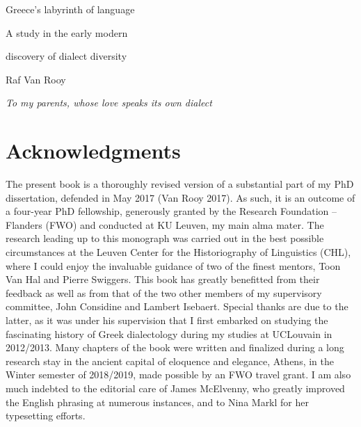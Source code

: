 
\clearpage\setcounter{page}{1}\begin{styleStandard}
Greece’s labyrinth of language
\end{styleStandard}

\begin{styleStandard}
A study in the early modern
\end{styleStandard}

\begin{styleStandard}
discovery of dialect diversity
\end{styleStandard}

\begin{styleStandard}
Raf Van Rooy
\end{styleStandard}

\clearpage\clearpage\begin{styleStandard}
\textit{To my parents, whose love speaks its own dialect}
\end{styleStandard}

\clearpage\clearpage\section[Table of contents]{}
\hypertarget{Toc19704798}{}\setcounter{tocdepth}{3}
\renewcommand\contentsname{}
\tableofcontents
\clearpage\clearpage\section{Acknowledgments}
\hypertarget{Toc19704799}{}\begin{styleStandard}
The present book is a thoroughly revised version of a substantial part of my PhD dissertation, defended in May 2017 (Van Rooy 2017). As such, it is an outcome of a four-year PhD fellowship, generously granted by the Research Foundation – Flanders (FWO) and conducted at KU Leuven, my main alma mater. The research leading up to this monograph was carried out in the best possible circumstances at the Leuven Center for the Historiography of Linguistics (CHL), where I could enjoy the invaluable guidance of two of the finest mentors, Toon Van Hal and Pierre Swiggers. This book has greatly benefitted from their feedback as well as from that of the two other members of my supervisory committee, John Considine and Lambert Isebaert. Special thanks are due to the latter, as it was under his supervision that I first embarked on studying the fascinating history of Greek dialectology during my studies at UCLouvain in 2012/2013. Many chapters of the book were written and finalized during a long research stay in the ancient capital of eloquence and elegance, Athens, in the Winter semester of 2018/2019, made possible by an FWO travel grant. I am also much indebted to the editorial care of James McElvenny, who greatly improved the English phrasing at numerous instances, and to Nina Markl for her typesetting efforts.
\end{styleStandard}

